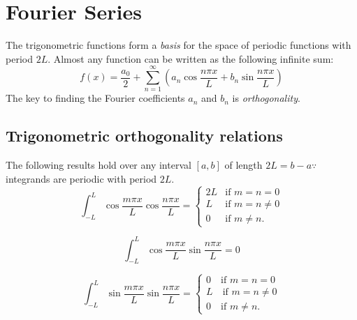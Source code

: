 \columnbreak
\section{Fourier Series}
The trigonometric functions form a \textit{basis} for the space of periodic functions with period $2L$. Almost
any function can be written as the following infinite sum:
\begin{equation*}
    f(x) = \frac{a_0}{2} + \sum_{n=1}^{\infty}\left(a_n \cos\frac{n\pi x}{L} + b_n \sin \frac{n \pi x}{L}\right)
\end{equation*}
The key to finding the Fourier coefficients $a_n$ and $b_n$ is \textit{orthogonality}.

\subsection*{Trigonometric orthogonality relations}
The following results hold over any interval $[a,b]$ of length $2L = b - a \because$ integrands are periodic
with period $2L$.
\begin{equation*}
    \int_{-L}^{L} \cos \frac{m \pi x}{L} \cos \frac{n \pi x}{L} = \begin{cases}
        2L &\textrm{if } m = n = 0 \\
        L  &\textrm{if } m = n \neq 0 \\
        0  &\textrm{if } m \neq n.
    \end{cases}
\end{equation*}

\begin{equation*}
    \int_{-L}^{L} \cos \frac{m \pi x}{L} \sin \frac{n \pi x}{L} = 0
\end{equation*}

\begin{equation*}
    \int_{-L}^{L} \sin \frac{m \pi x}{L} \sin \frac{n \pi x}{L}   = \begin{cases}
        0 \quad \textrm{if } m = n = 0 \\
        L \quad \textrm{if } m = n \neq 0 \\
        0 \quad \textrm{if } m \neq n.
    \end{cases}
\end{equation*}

